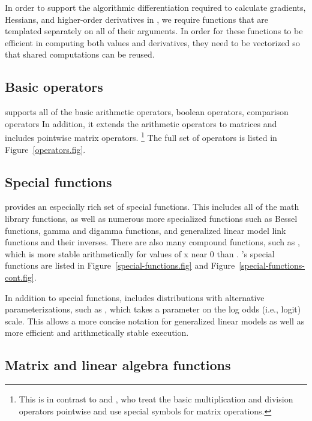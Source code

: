 \documentclass[article]{jss}
\begin{document}
In order to support the algorithmic differentiation required to
calculate gradients, Hessians, and higher-order derivatives in
, we require  functions that are 
templated separately on all of their arguments.  In order for these
functions to be efficient in computing both values and derivatives,
they need to be vectorized so that shared computations can be reused.

\subsection{Basic operators}

 supports all of the basic  arithmetic
operators, boolean operators, comparison operators  In addition, it
extends the arithmetic operators to matrices and includes pointwise
matrix operators.%
%
\footnote{This is in contrast to  and , who
  treat the basic multiplication and division operators pointwise and
  use special symbols for matrix operations.}
%
The full set of operators is listed in Figure~\ref{operators.fig}.

\subsection{Special functions}

 provides an especially rich set of special functions.
This includes all of the  math library functions, as
well as numerous more specialized functions such as Bessel functions,
gamma and digamma functions, and generalized linear model link
functions and their inverses.  There are also many compound functions,
such as , which is more stable arithmetically for
values of x near 0 than .  's special
functions are listed in Figure~\ref{special-functions.fig} and
Figure~\ref{special-functions-cont.fig}.  

In addition to special functions,  includes distributions with
alternative parameterizations, such as , which
takes a parameter on the log odds (i.e., logit) scale.  This allows a
more concise notation for generalized linear models as well as more
efficient and arithmetically stable execution.  


\subsection{Matrix and linear algebra functions}
\end{document}
